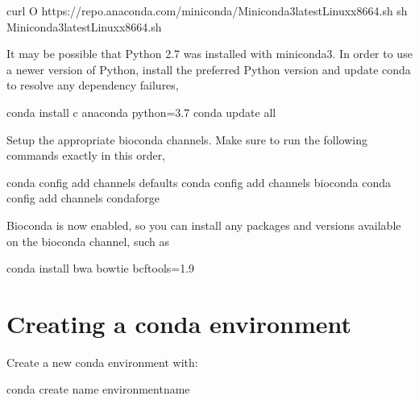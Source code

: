\documentclass[letterpaper,10pt,english]{sphinxhowto}
\begin{document}
\begin{sphinxVerbatim}[commandchars=\\\{\}]
\PYGZdl{} curl \PYGZhy{}O https://repo.anaconda.com/miniconda/Miniconda3\PYGZhy{}latest\PYGZhy{}Linux\PYGZhy{}x86\PYGZus{}64.sh
\PYGZdl{} sh Miniconda3\PYGZhy{}latest\PYGZhy{}Linux\PYGZhy{}x86\PYGZus{}64.sh
\end{sphinxVerbatim}

It may be possible that Python 2.7 was installed with miniconda3. In order to use a newer version of Python, install the preferred Python version and update conda to resolve any dependency failures,

\begin{sphinxVerbatim}[commandchars=\\\{\}]
\PYGZdl{} conda install \PYGZhy{}c anaconda python=3.7
\PYGZdl{} conda update \PYGZhy{}\PYGZhy{}all
\end{sphinxVerbatim}

Setup the appropriate bioconda channels. Make sure to run the following commands exactly in this order,

\begin{sphinxVerbatim}[commandchars=\\\{\}]
\PYGZdl{} conda config \PYGZhy{}\PYGZhy{}add channels defaults
\PYGZdl{} conda config \PYGZhy{}\PYGZhy{}add channels bioconda
\PYGZdl{} conda config \PYGZhy{}\PYGZhy{}add channels conda\PYGZhy{}forge
\end{sphinxVerbatim}

Bioconda is now enabled, so you can install any packages and versions available on the bioconda channel, such as

\begin{sphinxVerbatim}[commandchars=\\\{\}]
\PYGZdl{} conda install bwa bowtie bcftools=1.9
\end{sphinxVerbatim}


\part{Creating a conda environment}
\label{\detokenize{index:creating-a-conda-environment}}
Create a new conda environment with:

\begin{sphinxVerbatim}[commandchars=\\\{\}]
\PYGZdl{} conda create \PYGZhy{}\PYGZhy{}name \PYGZlt{}environment\PYGZhy{}name\PYGZgt{}
\end{sphinxVerbatim}
\end{document}
